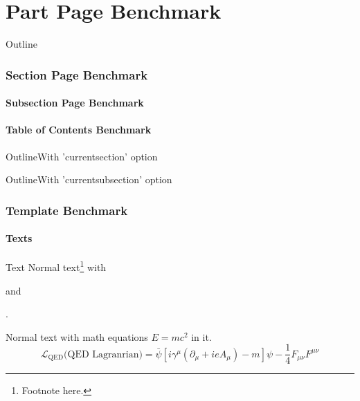 \part{Part Page Benchmark}

\frame{\titlepage}

\frame{\partpage}

\begin{frame}{Outline}
\tableofcontents
\end{frame}

\section[Section Page]{Section Page Benchmark}
\frame{\sectionpage}

\subsection[Subsection Page]{Subsection Page Benchmark}
\frame{\subsectionpage}

\subsection[TOC Page]{Table of Contents Benchmark}

\begin{frame}{Outline}{With 'currentsection' option}
\tableofcontents[currentsection]
\end{frame}

\begin{frame}{Outline}{With 'currentsubsection' option}
\tableofcontents[currentsubsection]
\end{frame}

\section[Template]{Template Benchmark}

\subsection{Texts}
\begin{frame}{Text}
Normal text\footnote{Footnote here.} with \begin{alertenv}\end{alertenv} and \begin{structureenv}\end{structureenv}.

Normal text with math equations $E=mc^2$ in it.
\[
\mathcal{L}_{\mathrm{QED}}\text{(QED Lagranrian)}=\bar{\psi}\left[i\gamma^\mu\left(\partial_\mu+ieA_\mu\right)-m\right]\psi-\frac{1}{4}F_{\mu\nu}F^{\mu\nu}
\]
\end{frame}

